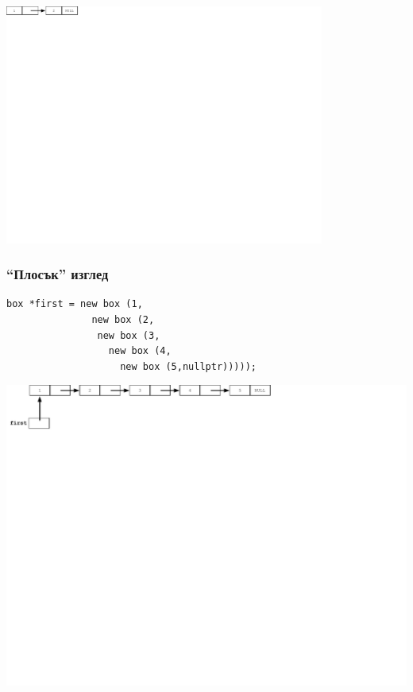 \documentclass{beamer}
\begin{document}
\begin{frame}[fragile]
\includegraphics[width=10.5cm]{images/01_llbox_twoboxes.pdf}


\end{frame}


\begin{frame}[fragile]
\frametitle{``Плосък'' изглед}

\begin{flushleft}
\begin{lstlisting}
box *first = new box (1,
               new box (2, 
                new box (3, 
                  new box (4, 
                    new box (5,nullptr)))));
\end{lstlisting}  
\end{flushleft}


\includegraphics[width=14.0cm]{images/02_ll_flatchain}

\end{frame}
\end{document}

